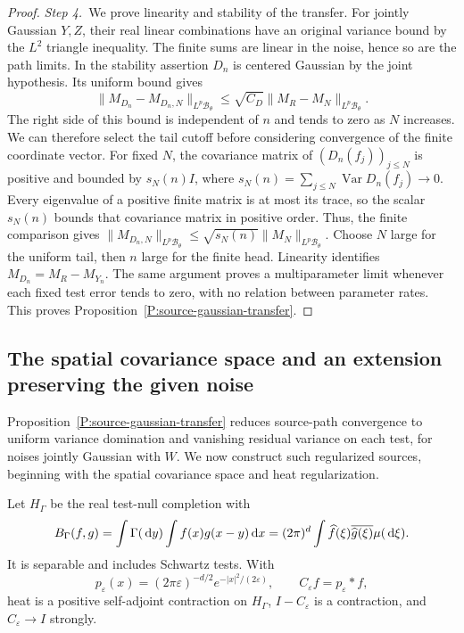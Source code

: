 \begin{proof}
  \medskip
  \noindent\textit{Step 4.~}We prove linearity and stability of the transfer.
  For jointly Gaussian $Y,Z$, their real linear combinations have an original
  variance bound by the $L^2$ triangle inequality. The finite sums are linear in
  the noise, hence so are the path limits. In the stability assertion $D_n$ is
  centered Gaussian by the joint hypothesis. Its uniform bound gives
  \[
    \|M_{D_n}-M_{D_n,N}\|_{L^p\mathscr{B}_\theta}
    \le\sqrt{C_D}\|M_R-M_N\|_{L^p\mathscr{B}_\theta}.
  \]
  The right side of this bound is independent of $n$ and tends to zero as $N$
  increases. We can therefore select the tail cutoff before considering
  convergence of the finite coordinate vector.
  For fixed $N$, the covariance matrix of $(D_n(f_j))_{j\le N}$ is positive and
  bounded by $s_N(n)I$, where $s_N(n) = \sum_{j\le N}\operatorname{Var}D_n(f_j)
  \to 0$. Every eigenvalue of a positive finite matrix is at most its trace,
  so the scalar $s_N(n)$ bounds that covariance matrix in positive order.
  Thus,
  the finite comparison gives $\|M_{D_n,N}\|_{L^p\mathscr{B}_\theta} \le
  \sqrt{s_N(n)}\|M_N\|_{L^p\mathscr{B}_\theta}$. Choose $N$ large for the
  uniform tail, then $n$ large for the finite head. Linearity identifies
  $M_{D_n} = M_R-M_{Y_n}$. The same argument proves a multiparameter limit
  whenever each fixed test error tends to zero, with no relation between
  parameter rates. This proves Proposition~\ref{P:source-gaussian-transfer}.
\end{proof}

\subsection{The spatial covariance space and an extension preserving the given noise}

Proposition~\ref{P:source-gaussian-transfer} reduces source-path convergence
to uniform variance domination and vanishing residual variance on each test,
for noises jointly Gaussian with $W$. We now construct such regularized
sources, beginning with the spatial covariance space and heat regularization.

\begin{lemma}\label{L:source-spatial-heat}
  Let $H_\Gamma$ be the real test-null completion with
  \[
    B_\Gamma(f,g)=\int\Gamma(\,\mathrm{d} y)\int f(x)g(x-y)\,\mathrm{d} x
    =(2\pi)^d\int\widehat{f}(\xi)\overline{\widehat{g}(\xi)}\mu(\,\mathrm{d}\xi).
  \]
  It is separable and includes Schwartz tests. With
  \begin{equation}\label{E:source-heat-definition}
    p_\varepsilon(x)=(2\pi\varepsilon)^{-d/2}
    e^{-|x|^2/(2\varepsilon)},\qquad C_\varepsilon f=p_\varepsilon*f,
  \end{equation}
  heat is a positive self-adjoint contraction on $H_\Gamma$, $I-C_\varepsilon$
  is a contraction, and $C_\varepsilon \to I$ strongly.
\end{lemma}

